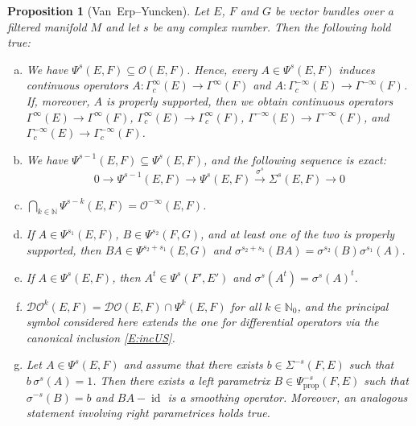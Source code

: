 \documentclass[reqno,12pt]{amsart}
\DeclareMathOperator{\id}{id}
\newcommand{\DO}{\mathcal D\mathcal O}
\newcommand\N{\mathbb N}
\newcommand\prop{\textrm{prop}}
\theoremstyle{plain}
\newtheorem{proposition}[theorem]{Proposition}
\theoremstyle{definition}
\begin{document}
\begin{proposition}[Van~Erp--Yuncken]\label{P:Psi}
Let $E$, $F$ and $G$ be vector bundles over a filtered manifold $M$ and let $s$ be any complex number.
Then the following hold true:
\begin{enumerate}[(a)]
\item\label{P:Psi:O}
We have $\Psi^s(E,F)\subseteq\mathcal O(E,F)$.
Hence, every $A\in\Psi^s(E,F)$ induces continuous operators
$A\colon\Gamma_c^\infty(E)\to\Gamma^\infty(F)$ and $A\colon\Gamma^{-\infty}_c(E)\to\Gamma^{-\infty}(F)$.
If, moreover, $A$ is properly supported, then we obtain continuous operators $\Gamma^\infty(E)\to\Gamma^\infty(F)$, $\Gamma^\infty_c(E)\to\Gamma^\infty_c(F)$, $\Gamma^{-\infty}(E)\to\Gamma^{-\infty}(F)$, and $\Gamma^{-\infty}_c(E)\to\Gamma^{-\infty}_c(F)$.
\item\label{P:Psi:symbsequ}
We have $\Psi^{s-1}(E,F)\subseteq\Psi^s(E,F)$, and the following sequence is exact:
$$
0\to\Psi^{s-1}(E,F)\to\Psi^s(E,F)\xrightarrow{\sigma^s}\Sigma^s(E,F)\to0
$$
\item\label{P:Psi:smooth}
$\bigcap_{k\in\N}\Psi^{s-k}(E,F)=\mathcal O^{-\infty}(E,F)$.
\item\label{P:Psi:mult}
If $A\in\Psi^{s_1}(E,F)$, $B\in\Psi^{s_2}(F,G)$, and at least one of the two is properly supported, then $BA\in\Psi^{s_2+s_1}(E,G)$ and $\sigma^{s_2+s_1}(BA)=\sigma^{s_2}(B)\sigma^{s_1}(A)$.
\item\label{P:Psi:trans}
If $A\in\Psi^s(E,F)$, then $A^t\in\Psi^s(F',E')$ and $\sigma^s(A^t)=\sigma^s(A)^t$.
\item\label{P:Psi:DO}
$\DO^k(E,F)=\DO(E,F)\cap\Psi^k(E,F)$ for all $k\in\N_0$, and the principal symbol considered here extends the one for differential operators via the canonical inclusion \eqref{E:incUS}.
\item\label{P:Psi:parametrix}
Let $A\in\Psi^s(E,F)$ and assume that there exists $b\in\Sigma^{-s}(F,E)$ such that $b\,\sigma^s(A)=1$.
Then there exists a left parametrix $B\in\Psi^{-s}_\prop(F,E)$ such that $\sigma^{-s}(B)=b$ and $BA-\id$ is a smoothing operator. 
Moreover, an analogous statement involving right parametrices holds true.
\end{enumerate}
\end{proposition}
\end{document}
